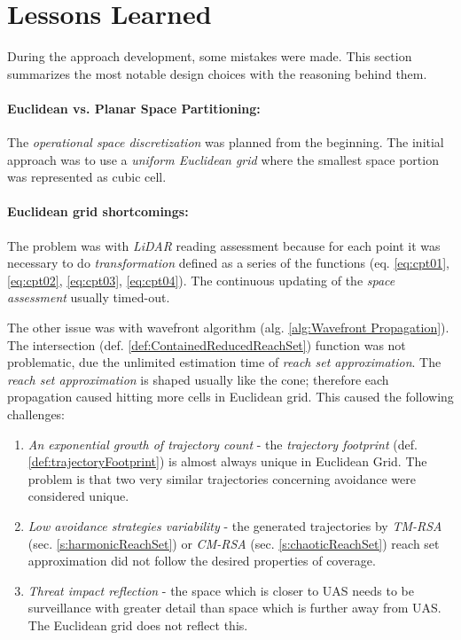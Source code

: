 \section{Lessons Learned}\label{s:lessonsLearned}
\noindent During the approach development, some mistakes were made. This section summarizes the most notable design choices with the reasoning behind them.

\paragraph{Euclidean vs. Planar Space Partitioning:} The \emph{operational space discretization} was planned from the beginning. The initial approach was to use a \emph{uniform Euclidean  grid} where the smallest space portion was represented as cubic cell.

\paragraph{Euclidean grid shortcomings:} The problem was with \emph{LiDAR} reading assessment because for each point it was necessary to do \emph{transformation} defined as  a series of the functions (eq. \ref{eq:cpt01}, \ref{eq:cpt02}, \ref{eq:cpt03}, \ref{eq:cpt04}). The continuous updating of the \emph{space assessment} usually timed-out. 

The other issue was with wavefront algorithm (alg. \ref{alg:Wavefront Propagation}). The intersection (def. \ref{def:ContainedReducedReachSet}) function was not problematic, due the unlimited estimation time of \emph{reach set approximation}. The \emph{reach set approximation} is shaped usually like the cone; therefore each propagation caused hitting more cells in Euclidean  grid. This caused the following challenges:

\begin{enumerate}
    \item \emph{An exponential growth of trajectory count} - the \emph{trajectory footprint} (def. \ref{def:trajectoryFootprint}) is almost always unique in Euclidean Grid. The problem is that two very similar trajectories concerning avoidance were considered unique.
    
    \item \emph{Low avoidance strategies variability} - the generated trajectories by \emph{TM-RSA} (sec. \ref{s:harmonicReachSet}) or \emph{CM-RSA} (sec. \ref{s:chaoticReachSet}) reach set approximation did not follow the desired properties of coverage.
    
    \item \emph{Threat impact reflection} - the space which is closer to UAS needs to be surveillance with greater detail than space which is further away from UAS. The Euclidean grid does not reflect this.
\end{enumerate}

